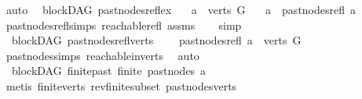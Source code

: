 \begin{isabellebody}
\ auto%
\endisatagproof
{\isafoldproof}%
%
\isadelimproof
\isanewline
%
\endisadelimproof
\isanewline
{}\isamarkupfalse%
\ {\isacharparenleft}{\kern0pt}\ blockDAG{\isacharparenright}{\kern0pt}\ past{\isacharunderscore}{\kern0pt}nodes{\isacharunderscore}{\kern0pt}refl{\isacharunderscore}{\kern0pt}ex{\isacharcolon}{\kern0pt}\isanewline
\ \ \ {\isachardoublequoteopen}a\ {\isasymin}\ verts\ G{\isachardoublequoteclose}\isanewline
\ \ \ {\isachardoublequoteopen}a\ {\isasymin}\ past{\isacharunderscore}{\kern0pt}nodes{\isacharunderscore}{\kern0pt}refl\ a{\isachardoublequoteclose}\isanewline
%
\isadelimproof
\ \ %
\endisadelimproof
%
\isatagproof
{}\isamarkupfalse%
\ past{\isacharunderscore}{\kern0pt}nodes{\isacharunderscore}{\kern0pt}refl{\isachardot}{\kern0pt}simps\ reachable{\isacharunderscore}{\kern0pt}refl\ assms\isanewline
\ \ \isamarkupfalse%
\ simp%
\endisatagproof
{\isafoldproof}%
%
\isadelimproof
\isanewline
%
\endisadelimproof
\isanewline
{}\isamarkupfalse%
\ {\isacharparenleft}{\kern0pt}\ blockDAG{\isacharparenright}{\kern0pt}\ past{\isacharunderscore}{\kern0pt}nodes{\isacharunderscore}{\kern0pt}refl{\isacharunderscore}{\kern0pt}verts{\isacharcolon}{\kern0pt}\ \isanewline
\ \ \ {\isachardoublequoteopen}past{\isacharunderscore}{\kern0pt}nodes{\isacharunderscore}{\kern0pt}refl\ a\ {\isasymsubseteq}\ verts\ G{\isachardoublequoteclose}\isanewline
%
\isadelimproof
\ \ %
\endisadelimproof
%
\isatagproof
{}\isamarkupfalse%
\ past{\isacharunderscore}{\kern0pt}nodes{\isachardot}{\kern0pt}simps\ reachable{\isacharunderscore}{\kern0pt}in{\isacharunderscore}{\kern0pt}verts\ \isamarkupfalse%
\ auto%
\endisatagproof
{\isafoldproof}%
%
\isadelimproof
\isanewline
%
\endisadelimproof
\isanewline
{}\isamarkupfalse%
\ {\isacharparenleft}{\kern0pt}\ blockDAG{\isacharparenright}{\kern0pt}\ finite{\isacharunderscore}{\kern0pt}past{\isacharcolon}{\kern0pt}\ {\isachardoublequoteopen}finite\ {\isacharparenleft}{\kern0pt}past{\isacharunderscore}{\kern0pt}nodes\ a{\isacharparenright}{\kern0pt}{\isachardoublequoteclose}\isanewline
%
\isadelimproof
\ \ %
\endisadelimproof
%
\isatagproof
{}\isamarkupfalse%
\ {\isacharparenleft}{\kern0pt}metis\ finite{\isacharunderscore}{\kern0pt}verts\ rev{\isacharunderscore}{\kern0pt}finite{\isacharunderscore}{\kern0pt}subset\ past{\isacharunderscore}{\kern0pt}nodes{\isacharunderscore}{\kern0pt}verts{\isacharparenright}{\kern0pt}%

\end{isabellebody}
